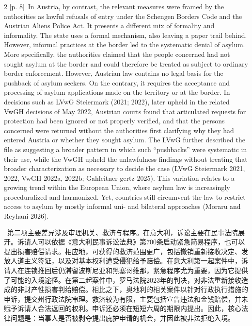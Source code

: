 \documentclass[10pt,a4paper]{article}
\begin{document}
\begin{paracol}{2}
{\scriptsize\color{gray} [p. 8]}\ In Austria, by contrast, the relevant measures were framed by the authorities as lawful refusals of entry under the Schengen Borders Code and the Austrian Aliens Police Act. It presents a different mix of formality and informality. The state uses a formal mechanism, also leaving a paper trail behind. However, informal practices at the border led to the systematic denial of asylum. More specifically, the authorities claimed that the people concerned had not sought asylum at the border and could therefore be treated as subject to ordinary border enforcement. However, Austrian law contains no legal basis for the pushback of asylum seekers. On the contrary, it requires the acceptance and processing of asylum applications made on the territory or at the border. In decisions such as LVwG Steiermark (2021; 2022), later upheld in the related VwGH decisions of May 2022, Austrian courts found that articulated requests for protection had been ignored or not properly verified, and that the persons concerned were returned without the authorities first clarifying why they had entered Austria or whether they sought asylum. The LVwG further described the file as suggesting a broader pattern in which such “pushbacks” were systematic in their use, while the VwGH upheld the unlawfulness findings without treating that broader characterization as necessary to decide the case (LVwG Steiermark 2021, 2022, VwGH 2022a, 2022b; Gahleitner-gertz 2025). This variation relates to a growing trend within the European Union, where asylum law is increasingly proceduralized and harmonized. Yet, countries still circumvent the law to restrict access to asylum by mostly informal uni- and bilateral approaches (Moraru and Reyhani 2026).\par
\switchcolumn*
{\scriptsize\color{gray} [p. 9]}\ 第二项主要差异涉及审理机关、救济与程序。在意大利，诉讼主要在民事法院展开。诉请人可以依据《意大利民事诉讼法典》第700条启动紧急简易程序，也可以提出损害赔偿请求。相应地，可获得的救济范围更广，包括撤销重新接收决定、发放人道主义签证，以及对基本权利遭受侵犯给予赔偿。在意大利第一起案件中，诉请人在连锁推回后仍滞留波斯尼亚和黑塞哥维那，紧急程序尤为重要，因为它提供了可能的入境途径。在第二起案件中，罗马法院2023年的判决，对非法重新接收造成的非财产性损害判给赔偿。相比之下，奥地利的相关案件以针对行政执行措施的申诉，提交州行政法院审理。救济较为有限，主要包括宣告违法和金钱赔偿，并未赋予诉请人合法返回的权利。申诉还必须在短短六周的期限内提出。因此，核心法律问题是：当事人是否被剥夺提出庇护申请的机会，并因此被非法拒绝入境。\par

\end{paracol}
\end{document}
